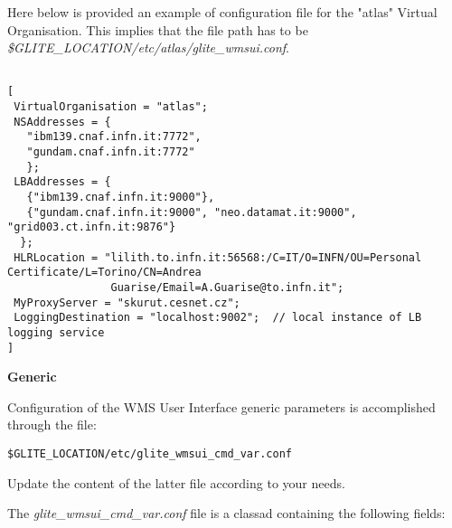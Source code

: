 Here below is provided an example of configuration file for the "atlas" Virtual Organisation. 
This implies that the file path has to be \textit{\$GLITE\_LOCATION/etc/atlas/glite\_wmsui.conf}. 

\smallskip
\begin{verbatim}

[
 VirtualOrganisation = "atlas";
 NSAddresses = {
   "ibm139.cnaf.infn.it:7772",
   "gundam.cnaf.infn.it:7772"
   };
 LBAddresses = {
   {"ibm139.cnaf.infn.it:9000"},
   {"gundam.cnaf.infn.it:9000", "neo.datamat.it:9000", "grid003.ct.infn.it:9876"}
  };
 HLRLocation = "lilith.to.infn.it:56568:/C=IT/O=INFN/OU=Personal Certificate/L=Torino/CN=Andrea 
                Guarise/Email=A.Guarise@to.infn.it";
 MyProxyServer = "skurut.cesnet.cz";
 LoggingDestination = "localhost:9002";  // local instance of LB logging service
]

\end{verbatim}
\medskip
\medskip


\textbf{Generic}


Configuration of the WMS User Interface generic parameters is accomplished through the file:

\smallskip
\begin{verbatim}
$GLITE_LOCATION/etc/glite_wmsui_cmd_var.conf
\end{verbatim}
\smallskip


Update the content of the latter file according to your needs.

The \textit{glite\_wmsui\_cmd\_var.conf} file is a classad containing the following fields:


\smallskip


